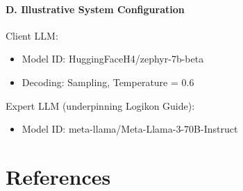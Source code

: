 \documentclass[
  letterpaper,
  DIV=11,
  numbers=noendperiod]{scrartcl}
\let\oldparagraph\paragraph
\renewcommand{\paragraph}[1]{\oldparagraph{#1}\mbox{}}
\providecommand{\tightlist}{%
  \setlength{\itemsep}{0pt}\setlength{\parskip}{0pt}}\usepackage{longtable,booktabs,array}
\begin{document}
\hypertarget{appendix-sys-config}{%
\paragraph{D. Illustrative System
Configuration}\label{appendix-sys-config}}

Client LLM:

\begin{itemize}
\tightlist
\item
  Model ID: HuggingFaceH4/zephyr-7b-beta
\item
  Decoding: Sampling, Temperature = 0.6
\end{itemize}

Expert LLM (underpinning Logikon Guide):

\begin{itemize}
\tightlist
\item
  Model ID: meta-llama/Meta-Llama-3-70B-Instruct
\end{itemize}

\hypertarget{references}{%
\section{References}\label{references}}
\end{document}
